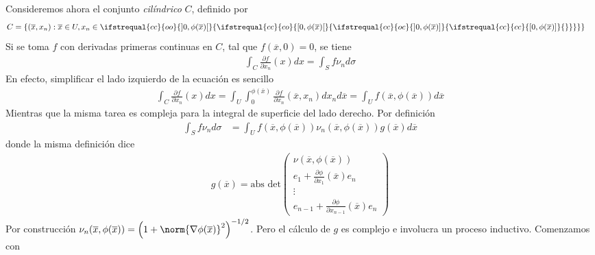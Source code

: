 \documentclass{report}
\theoremstyle{remark}
\newcommand{\leftOpenInterval}{\left]}
\newcommand{\rightOpenInterval}{\right[}
\newcommand{\leftClosedInterval}{\left[}
\newcommand{\rightClosedInterval}{\right]}
\newcommand{\interval}[3]{%
  \ifstrequal{#1}{oo}{%
    \leftOpenInterval #2, #3 \rightOpenInterval%
  }{%
    \ifstrequal{#1}{co}{%
      \leftClosedInterval #2, #3 \rightOpenInterval%
    }{%
      \ifstrequal{#1}{oc}{
        \leftOpenInterval #2, #3 \rightClosedInterval%
      }{%
        \ifstrequal{#1}{cc}{
          \leftClosedInterval #2, #3 \rightClosedInterval
        }{%
        }%
      }%
    }%
  }%
}
\begin{document}
  Consideremos ahora el conjunto \emph{cilíndrico} \(C\), definido por
  \begin{align}
    C
    &=
    \{(\overline{x}, x_n) : \overline{x} \in U, x_n \in \interval{cc}{0}{\phi(\overline{x})}\}
  \end{align}
  Si se toma \(f\) con derivadas primeras continuas en \(C\), tal que \(f(\overline{x}, 0) = 0\), se tiene
  \begin{align}
    \label{equation:divergenceTheoremInACylinder}
    \int_C \frac{\partial f}{\partial x_n}(x) dx
    =
    \int_S f \nu_n d \sigma
  \end{align}
  En efecto, simplificar el lado izquierdo de la ecuación es sencillo
  \begin{align}
    \int_C \frac{\partial f}{\partial x_n}(x) dx
    =
    \int_U
      \int_0^{\phi(\overline{x})}
        \frac{\partial f}{\partial x_n} (\overline{x}, x_n)
      d x_n
    d \overline{x}
    =
    \int_U
      f(\overline{x}, \phi(\overline{x}))
    d \overline{x}
  \end{align}
  Mientras que la misma tarea es compleja para la integral de superficie del lado derecho.
  Por definición
  \begin{align}
    \int_S f \nu_n d \sigma
    &=
    \int_U
      f(\overline{x}, \phi(\overline{x}))
      \nu_n(\overline{x}, \phi(\overline{x}))
      g(\overline{x})
    d \overline{x}
  \end{align}
  donde la misma definición dice
  \begin{align}
    g(\overline{x})
    =
    \text{abs det}
    \begin{pmatrix}
      \nu(\overline{x}, \phi(\overline{x}))
      \\
      e_1
      +
      \frac{\partial \phi}{\partial x_1}(\overline{x})
      e_n
      \\
      \vdots
      \\
      e_{n - 1}
      +
      \frac{\partial \phi}{\partial x_{n - 1}}(\overline{x})
      e_n
    \end{pmatrix}
  \end{align}
  Por construcción
  \(
    \nu_n (\overline{x}, \phi(\overline{x}))
    =
    \left(1 + \norm{\nabla \phi (\overline{x})}^2\right)^{- 1 / 2}
  \).
  Pero el cálculo de \(g\) es complejo e involucra un proceso inductivo.
  Comenzamos con
\end{document}
